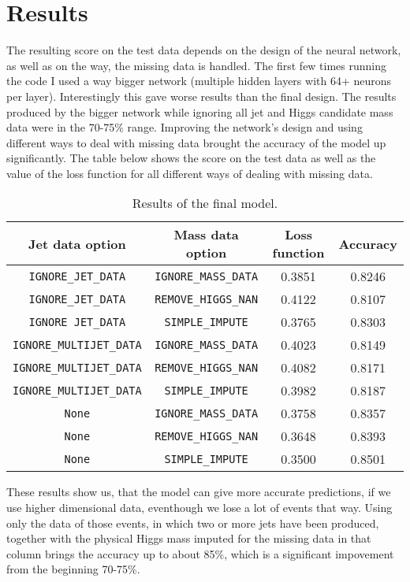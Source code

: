 \section{Results}\label{sec:results}

The resulting score on the test data depends on the design of the neural network, as well as on the way, the missing data is handled.
The first few times running the code I used a way bigger network (multiple hidden layers with 64+ neurons per layer).
Interestingly this gave worse results than the final design.
The results produced by the bigger network while ignoring all jet and Higgs candidate mass data were in the 70-75\% range.
Improving the network's design and using different ways to deal with missing data brought the accuracy of the model up significantly.
The table below shows the score on the test data as well as the value of the loss function for all different ways of dealing with missing data.

\begin{table}[H]

\centering
\begin{tabular}{|c|c|c|c|}
\hline
Jet data option					& Mass data	option			& Loss function	& Accuracy	\\
\hline
\texttt{IGNORE\_JET\_DATA}		& \texttt{IGNORE\_MASS\_DATA}	& 0.3851		& 0.8246	\\
\texttt{IGNORE\_JET\_DATA}		& \texttt{REMOVE\_HIGGS\_NAN}	& 0.4122		& 0.8107	\\
\texttt{IGNORE\ JET\_DATA}		& \texttt{SIMPLE\_IMPUTE}		& 0.3765		& 0.8303	\\
\hline
\texttt{IGNORE\_MULTIJET\_DATA}& \texttt{IGNORE\_MASS\_DATA}	& 0.4023		& 0.8149	\\
\texttt{IGNORE\_MULTIJET\_DATA}& \texttt{REMOVE\_HIGGS\_NAN}	& 0.4082		& 0.8171	\\
\texttt{IGNORE\_MULTIJET\_DATA}& \texttt{SIMPLE\_IMPUTE}		& 0.3982		& 0.8187	\\
\hline
\texttt{None}					& \texttt{IGNORE\_MASS\_DATA}	& 0.3758		& 0.8357	\\
\texttt{None}					& \texttt{REMOVE\_HIGGS\_NAN}	& 0.3648		& 0.8393	\\
\texttt{None}					& \texttt{SIMPLE\_IMPUTE}		& 0.3500		& 0.8501	\\
\hline
\end{tabular}
\caption{Results of the final model.}
\end{table}

These results show us, that the model can give more accurate predictions, if we use higher dimensional data, eventhough we lose a lot of events that way.
Using only the data of those events, in which two or more jets have been produced, together with the physical Higgs mass imputed for the missing data in that column brings the accuracy up to about 85\%, which is a significant impovement from the beginning 70-75\%.
